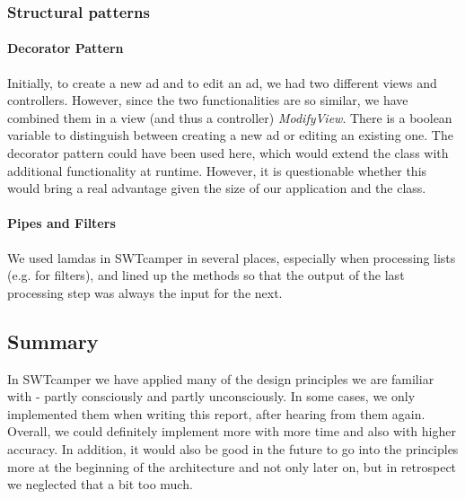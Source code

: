 \subsubsection{Structural patterns}

\paragraph{Decorator Pattern}
Initially, to create a new ad and to edit an ad, we had two different views and controllers. However, since the two functionalities are so similar, we have combined them in a view (and thus a controller) \textit{ModifyView}. There is a boolean variable to distinguish between creating a new ad or editing an existing one. The decorator pattern could have been used here, which would extend the class with additional functionality at runtime. However, it is questionable whether this would bring a real advantage given the size of our application and the class.

\paragraph{Pipes and Filters}
We used lamdas in SWTcamper in several places, especially when processing lists (e.g. for filters), and lined up the methods so that the output of the last processing step was always the input for the next.

\subsection{Summary}
In SWTcamper we have applied many of the design principles we are familiar with - partly consciously and partly unconsciously. In some cases, we only implemented them when writing this report, after hearing from them again. Overall, we could definitely implement more with more time and also with higher accuracy. In addition, it would also be good in the future to go into the principles more at the beginning of the architecture and not only later on, but in retrospect we neglected that a bit too much.